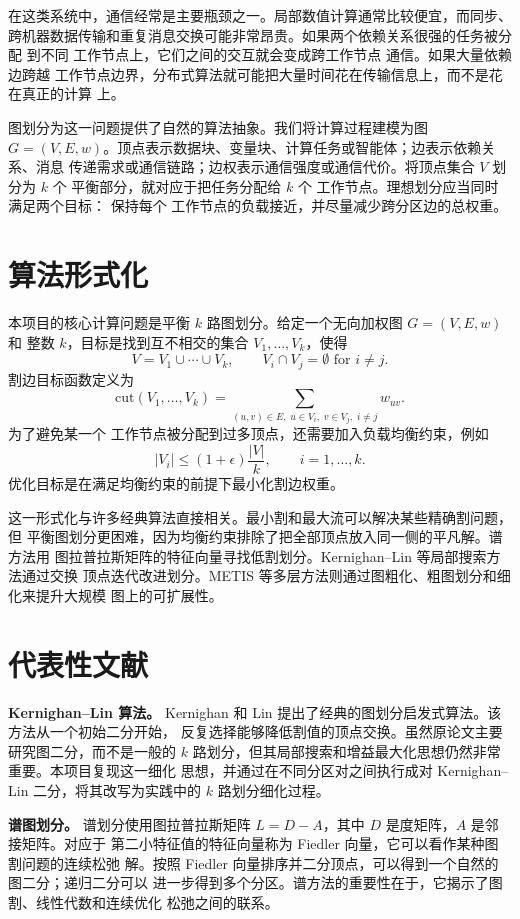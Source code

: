 \documentclass[UTF8, 11pt]{ctexart}
\begin{document}
在这类系统中，通信经常是主要瓶颈之一。局部数值计算通常比较便宜，而同步、
跨机器数据传输和重复消息交换可能非常昂贵。如果两个依赖关系很强的任务被分配
到不同 工作节点上，它们之间的交互就会变成跨工作节点 通信。如果大量依赖边跨越
工作节点边界，分布式算法就可能把大量时间花在传输信息上，而不是花在真正的计算
上。

图划分为这一问题提供了自然的算法抽象。我们将计算过程建模为图
$G=(V,E,w)$。顶点表示数据块、变量块、计算任务或智能体；边表示依赖关系、消息
传递需求或通信链路；边权表示通信强度或通信代价。将顶点集合 $V$ 划分为 $k$ 个
平衡部分，就对应于把任务分配给 $k$ 个 工作节点。理想划分应当同时满足两个目标：
保持每个 工作节点的负载接近，并尽量减少跨分区边的总权重。

\section{算法形式化}

本项目的核心计算问题是平衡 $k$ 路图划分。给定一个无向加权图 $G=(V,E,w)$ 和
整数 $k$，目标是找到互不相交的集合 $V_1,\ldots,V_k$，使得
\[
    V = V_1 \cup \cdots \cup V_k,
    \qquad V_i \cap V_j = \emptyset \text{ for } i\neq j.
\]
割边目标函数定义为
\[
    \mathrm{cut}(V_1,\ldots,V_k)
    =
    \sum_{(u,v)\in E,\; u\in V_i,\; v\in V_j,\; i\neq j} w_{uv}.
\]
为了避免某一个 工作节点被分配到过多顶点，还需要加入负载均衡约束，例如
\[
    |V_i| \leq (1+\epsilon)\frac{|V|}{k},
    \qquad i=1,\ldots,k.
\]
优化目标是在满足均衡约束的前提下最小化割边权重。

这一形式化与许多经典算法直接相关。最小割和最大流可以解决某些精确割问题，但
平衡图划分更困难，因为均衡约束排除了把全部顶点放入同一侧的平凡解。谱方法用
图拉普拉斯矩阵的特征向量寻找低割划分。Kernighan--Lin 等局部搜索方法通过交换
顶点迭代改进划分。METIS 等多层方法则通过图粗化、粗图划分和细化来提升大规模
图上的可扩展性。

\section{代表性文献}

\textbf{Kernighan--Lin 算法。}
Kernighan 和 Lin 提出了经典的图划分启发式算法。该方法从一个初始二分开始，
反复选择能够降低割值的顶点交换。虽然原论文主要研究图二分，而不是一般的
$k$ 路划分，但其局部搜索和增益最大化思想仍然非常重要。本项目复现这一细化
思想，并通过在不同分区对之间执行成对 Kernighan--Lin 二分，将其改写为实践中的
$k$ 路划分细化过程。

\textbf{谱图划分。}
谱划分使用图拉普拉斯矩阵 $L=D-A$，其中 $D$ 是度矩阵，$A$ 是邻接矩阵。对应于
第二小特征值的特征向量称为 Fiedler 向量，它可以看作某种图割问题的连续松弛
解。按照 Fiedler 向量排序并二分顶点，可以得到一个自然的图二分；递归二分可以
进一步得到多个分区。谱方法的重要性在于，它揭示了图割、线性代数和连续优化
松弛之间的联系。
\end{document}
